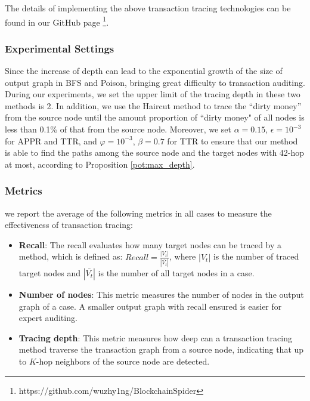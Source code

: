 The details of implementing the above transaction tracing technologies can be found in our GitHub page \footnote{https://github.com/wuzhy1ng/BlockchainSpider}.

\subsubsection{Experimental Settings} 
Since the increase of depth can lead to the exponential growth of the size of output graph in BFS and Poison, bringing great difficulty to transaction auditing. During our experiments, we set the upper limit of the tracing depth in these two methods is 2. In addition, we use the Haircut method to trace the ``dirty money'' from the source node until the amount proportion of ``dirty money" of all nodes is less than 0.1\% of that from the source node.
Moreover, we set $\alpha=0.15$, $\epsilon=10^{-3}$ for APPR and TTR, and $\varphi=10^{-3}$, $\beta=0.7$ for TTR to ensure that our method is able to find the paths among the source node and the target nodes with 42-hop at most, according to Proposition \ref{pot:max_depth}.

\subsubsection{Metrics}
we report the average of the following metrics in all cases to measure the effectiveness of transaction tracing:
\begin{itemize}
    \item \textbf{Recall}: The recall evaluates how many target nodes can be traced by a method, which is defined as: $Recall = \frac{|V_t|}{|\bar{V_t}|}$, where $|V_t|$ is the number of traced target nodes and $|\bar{V_t}|$ is the number of all target nodes in a case.
    
    \item \textbf{Number of nodes}: This metric measures the number of nodes in the output graph of a case. A smaller output graph with recall ensured is easier for expert auditing.
    
    \item \textbf{Tracing depth}: This metric measures how deep can a transaction tracing method traverse the transaction graph from a source node, indicating that up to $K$-hop neighbors of the source node are detected.
\end{itemize}

